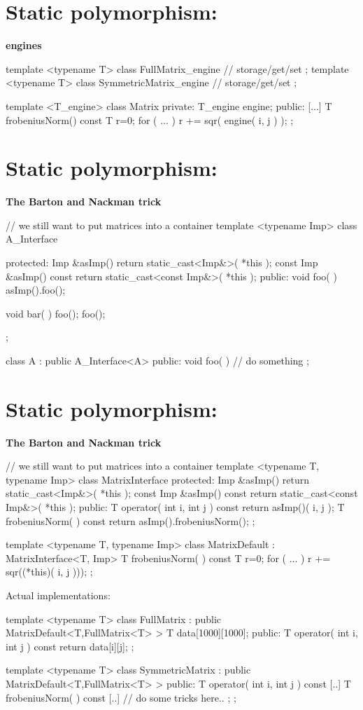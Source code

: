\section{Static polymorphism:} \textbf{engines}
\begin{myverbatim}
template <typename T>
class FullMatrix_engine { // storage/get/set };
template <typename T>
class SymmetricMatrix_engine { // storage/get/set };

template <T_engine>
class Matrix {
private:
  T_engine engine;
public:
  [...]
  T frobeniusNorm() const {
    T r=0;
    for ( ... ) { r += sqr( engine( i, j ) ); }
  }
};
\end{myverbatim}

\section{Static polymorphism: } \textbf{The Barton and Nackman trick}
\begin{myverbatim}
// we still want to put matrices into a container
template <typename Imp>
class A_Interface {
protected:
  Imp &asImp() { return static_cast<Imp&>( *this ); }
  const Imp &asImp() const { return static_cast<const Imp&>( *this ); }
public:
  void foo( ) { asImp().foo(); }

  void bar( ) { foo(); foo(); }
};

class A : public A_Interface<A> {
public:
  void foo( ) { // do something }
};
\end{myverbatim}


\section{Static polymorphism: } \textbf{The Barton and Nackman trick}
{\small
\begin{myverbatim}
// we still want to put matrices into a container
template <typename T, typename Imp>
class MatrixInterface {
protected:
  Imp &asImp() { return static_cast<Imp&>( *this ); }
  const Imp &asImp() const { return static_cast<const Imp&>( *this ); }
public:
  T operator( int i, int j ) const { return asImp()( i, j ); }
  T frobeniusNorm( ) const { return asImp().frobeniusNorm(); }
};

template <typename T, typename Imp>
class MatrixDefault : MatrixInterface<T, Imp>{
  T frobeniusNorm( ) const {
    T r=0;
    for ( ... ) { r += sqr((*this)( i, j ))); }
  }
};
\end{myverbatim}

Actual implementations:
\begin{myverbatim}
template <typename T>
class FullMatrix : public MatrixDefault<T,FullMatrix<T> > {
  T data[1000][1000];
public:
  T operator( int i, int j ) const { return data[i][j]; }
};

template <typename T>
class SymmetricMatrix : public MatrixDefault<T,FullMatrix<T> > {
public:
  T operator( int i, int j ) const { [..] }
  T frobeniusNorm( ) const { [..] // do some tricks here.. ; }
};

\end{myverbatim}
}


